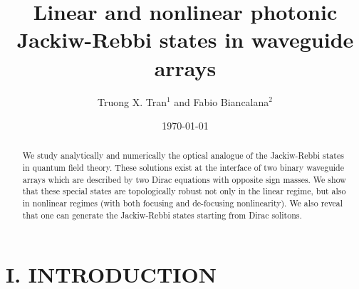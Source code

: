 \documentclass[twocolumn,aps, prl,showpacs]{revtex4}
\begin{document}
\title{Linear and nonlinear photonic Jackiw-Rebbi states in waveguide arrays}
\author{Truong X. Tran$^{1}$ and Fabio Biancalana$^{2}$}
\date{\today}



\begin{abstract}
We study analytically and numerically the optical analogue of the Jackiw-Rebbi states in quantum field theory. These solutions exist at the interface of two binary waveguide arrays which are described by two Dirac equations with opposite sign masses. We show that these special states are topologically robust not only in the linear regime, but also in nonlinear regimes (with both focusing and de-focusing nonlinearity). We also reveal that one can generate the Jackiw-Rebbi states starting from  Dirac solitons.
\end{abstract}
\maketitle

\section{I. INTRODUCTION}
\label{Introduction}
\end{document}
